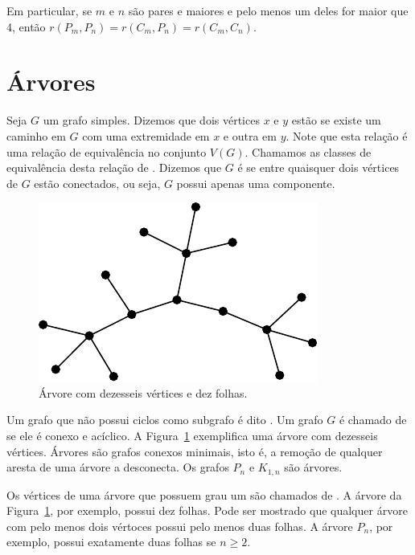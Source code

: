 Em particular, se $m$ e $n$ são pares e maiores e pelo menos um deles for maior que 4, então $r(P_m, P_n) = r(C_m, P_n) = r(C_m, C_n)$.


\section{Árvores}

Seja $G$ um grafo simples. Dizemos que dois vértices $x$ e $y$ estão  se existe um caminho em $G$ com uma extremidade em $x$ e outra em $y$. Note que esta relação é uma relação de equivalência no conjunto $V(G)$. Chamamos as classes de equivalência desta relação de . Dizemos que $G$ é  se entre quaisquer dois vértices de $G$ estão conectados, ou seja, $G$ possui apenas uma componente.

\begin{figure}[ht!]
\centering
\includegraphics{figures/3_graph_4_tree}
\caption{Árvore com dezesseis vértices e dez folhas.}
\label{graph:fig:tree}
\end{figure}

Um grafo que não possui ciclos como subgrafo é dito .
Um grafo $G$ é chamado de  se ele é conexo e acíclico. A Figura~\ref{graph:fig:tree} exemplifica uma árvore com dezesseis vértices. Árvores são grafos conexos minimais, isto é, a remoção de qualquer aresta de uma árvore a desconecta. Os grafos $P_n$ e $K_{1,n}$ são árvores.

Os vértices de uma árvore que possuem grau um são chamados de . A árvore da Figura~\ref{graph:fig:tree}, por exemplo, possui dez folhas. Pode ser mostrado que qualquer árvore com pelo menos dois vértoces possui pelo menos duas folhas. A árvore $P_n$, por exemplo, possui exatamente duas folhas se $n \geq 2$.

